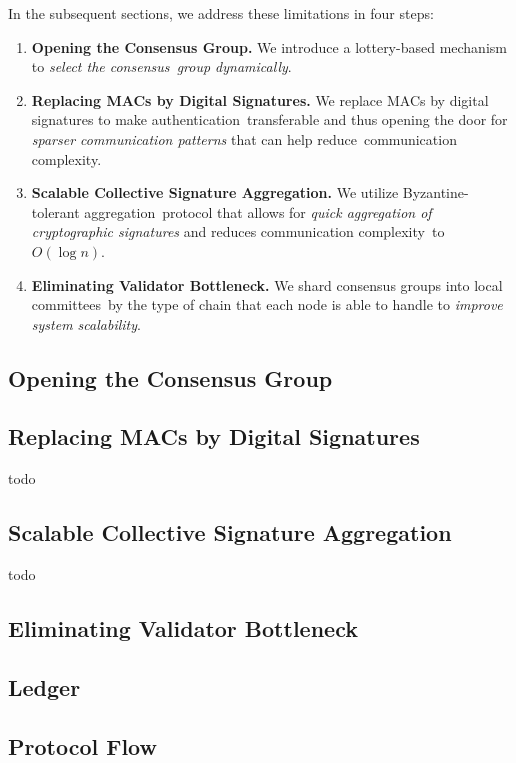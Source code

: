 In the subsequent sections, we address these limitations in four steps:
\begin{enumerate}
    \item \textbf{Opening the Consensus Group.} We introduce a lottery-based mechanism to \emph{select the consensus\
    group dynamically}.
    \item \textbf{Replacing MACs by Digital Signatures.} We replace MACs by digital signatures to make authentication\
    transferable and thus opening the door for \emph{sparser communication patterns} that can help reduce\
    communication complexity.
    \item \textbf{Scalable Collective Signature Aggregation.} We utilize Byzantine-tolerant aggregation\
    protocol that allows for \emph{quick aggregation of cryptographic signatures} and reduces communication complexity\
    to $O(\log{n})$.
    \item \textbf{Eliminating Validator Bottleneck.} We shard consensus groups into local committees\
    by the type of chain that each node is able to handle to \emph{improve system scalability}.
\end{enumerate}

\subsection{Opening the Consensus Group}\label{subsec:opening-consensus-group}


\subsection{Replacing MACs by Digital Signatures}\label{subsec:replacing-macs-by-digital-signatures}

todo

\subsection{Scalable Collective Signature Aggregation}\label{subsec:scalable-collective-signature-aggregation}

todo

\subsection{Eliminating Validator Bottleneck}\label{subsec:eliminating-validator-bottleneck}


\subsection{Ledger}\label{subsec:ledger-model}


\subsection{Protocol Flow}\label{subsec:protocol-flow}

